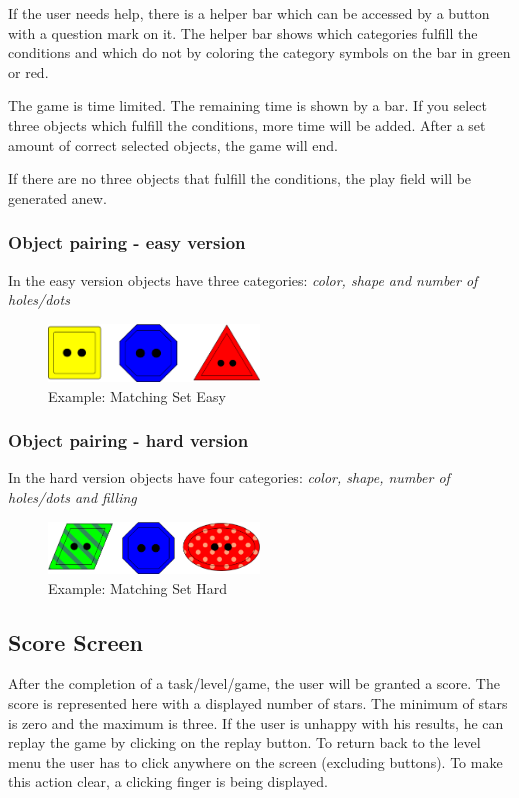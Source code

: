 If the user needs help, there is a helper bar which can be accessed by a button with a question mark on it.
The helper bar shows which categories fulfill the conditions and which do not
by coloring the category symbols on the bar in green or red.

The game is time limited. The remaining time is shown by a bar.
If you select three objects which fulfill the conditions, more time will be added.
After a set amount of correct selected objects, the game will end.

If there are no three objects that fulfill the conditions, the play field will be generated anew.

\subsubsection{Object pairing - easy version}\label{subsubsec:object-pairing---easy-version}
In the easy version objects have three categories: \textit{color, shape and number of holes/dots}

\begin{figure}[H]
    \centering
    \includegraphics[width=0.5\textwidth]{figures/matchingseteasy}
    \caption{Example: Matching Set Easy}
    \label{fig:matchingseteasy}
\end{figure}

\subsubsection{Object pairing - hard version}\label{subsubsec:object-pairing---hard-version}
In the hard version objects have four categories: \textit{color, shape, number of holes/dots and filling}

\begin{figure}[H]
    \centering
    \includegraphics[width=0.5\textwidth]{figures/matchingsethard}
    \caption{Example: Matching Set Hard}
    \label{fig:matchingsethard}
\end{figure}

\subsection{Score Screen}\label{subsec:score-screen}
After the completion of a task/level/game, the user will be granted a score.
The score is represented here with a displayed number of stars.
The minimum of stars is zero and the maximum is three.
If the user is unhappy with his results, he can replay the game by clicking on the replay button.
To return back to the level menu the user has to click anywhere on the screen (excluding buttons).
To make this action clear, a clicking finger is being displayed.

